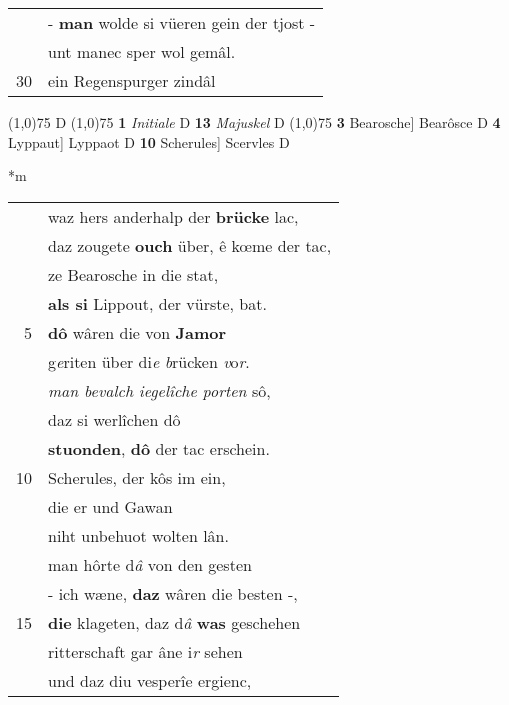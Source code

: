 \documentclass[8pt,a4paper,notitlepage]{article}
\begin{document}
\begin{table}[ht]
\begin{minipage}[t]{0.5\linewidth}
\begin{tabular}{rl}
 & - \textbf{man} wolde si vüeren gein der tjost -\\ 
 & unt manec sper wol gemâl.\\ 
30 & ein Regenspurger zindâl\\ 
\end{tabular}
\scriptsize
\line(1,0){75} \newline
D \newline
\line(1,0){75} \newline
\textbf{1} \textit{Initiale} D  \textbf{13} \textit{Majuskel} D  \newline
\line(1,0){75} \newline
\textbf{3} Bearosche] Bearôsce D \textbf{4} Lyppaut] Lyppaot D \textbf{10} Scherules] Scervles D \newline
\end{minipage}
\hspace{0.5cm}
\begin{minipage}[t]{0.5\linewidth}
\small
\begin{center}*m
\end{center}
\begin{tabular}{rl}
 & waz hers anderhalp der \textbf{brücke} lac,\\ 
 & daz zougete \textbf{ouch} über, ê kœme der tac,\\ 
 & ze Bearosche in die stat,\\ 
 & \textbf{als si} Lippout, der vürste, bat.\\ 
5 & \textbf{dô} wâren die von \textbf{Jamor}\\ 
 & g\textit{e}riten über di\textit{e} \textit{b}rücken \textit{v}o\textit{r}.\\ 
 & \textit{man bevalch iegelîche porten} sô,\\ 
 & daz si werlîchen dô\\ 
 & \textbf{stuonden}, \textbf{dô} der tac erschein.\\ 
10 & Scherules, der kôs im ein,\\ 
 & die er und Gawan\\ 
 & niht unbehuot wolten lân.\\ 
 & man hôrte d\textit{â} von den gesten\\ 
 & - ich wæne, \textbf{daz} wâren die besten -,\\ 
15 & \textbf{die} klageten, daz d\textit{â} \textbf{was} geschehen\\ 
 & ritterschaft gar âne i\textit{r} sehen\\ 
 & und daz diu vesperîe ergienc,\\ 

\end{tabular}
\end{minipage}
\end{table}
\end{document}
